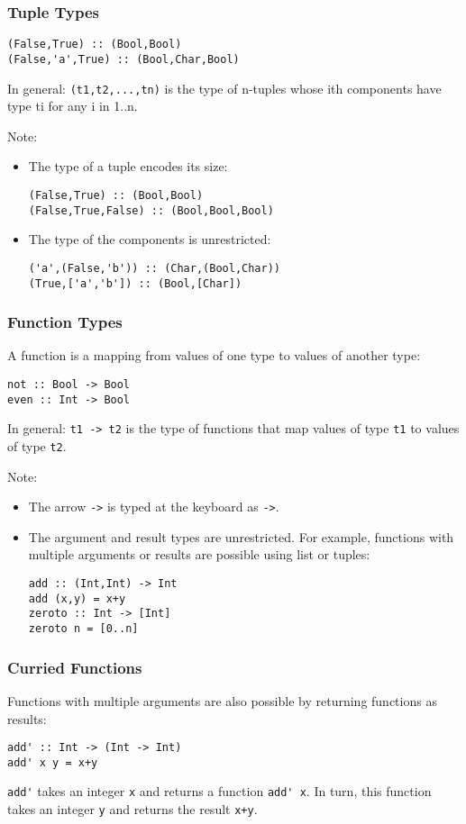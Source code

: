\begin{multicols}{2}
\subsubsection{Tuple Types}
\begin{lstlisting}
(False,True) :: (Bool,Bool)
(False,'a',True) :: (Bool,Char,Bool)
\end{lstlisting}
In general: \lstinline{(t1,t2,...,tn)} is the type of n-tuples whose ith components have type ti for any i in 1..n.

Note:
\begin{itemize}
  \item The type of a tuple encodes its size:
\begin{lstlisting}
(False,True) :: (Bool,Bool)
(False,True,False) :: (Bool,Bool,Bool)
\end{lstlisting}
  \item The type of the components is unrestricted:
\begin{lstlisting}
('a',(False,'b')) :: (Char,(Bool,Char))
(True,['a','b']) :: (Bool,[Char])
\end{lstlisting}
\end{itemize}

\subsubsection{Function Types}
A function is a mapping from values of one type to values of another type:
\begin{lstlisting}
not :: Bool -> Bool
even :: Int -> Bool
\end{lstlisting}
In general: \lstinline{t1 -> t2} is the type of functions that map values of type \lstinline{t1} to values of type \lstinline{t2}.

Note:
\begin{itemize}
  \item The arrow \lstinline{->} is typed at the keyboard as \lstinline{->}.
  \item The argument and result types are unrestricted. For example, functions with multiple arguments or results are possible using list or tuples:
\begin{lstlisting}
add :: (Int,Int) -> Int
add (x,y) = x+y
zeroto :: Int -> [Int]
zeroto n = [0..n]
\end{lstlisting}
\end{itemize}

\subsubsection{Curried Functions}
Functions with multiple arguments are also possible by returning functions as results:
\begin{lstlisting}
add' :: Int -> (Int -> Int)
add' x y = x+y
\end{lstlisting}
\lstinline{add'} takes an integer \lstinline{x} and returns a function \lstinline{add' x}. In turn, this function takes an integer \lstinline{y} and returns the result \lstinline{x+y}.


\end{multicols}
